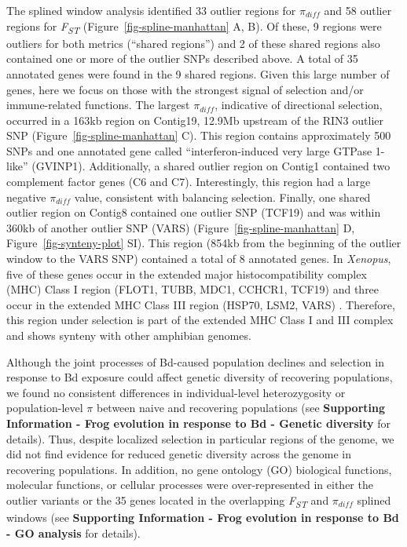 \documentclass[
  letterpaper,
  DIV=11,
  numbers=noendperiod]{scrartcl}
\begin{document}
The splined window analysis identified 33 outlier regions for
\(\pi_{diff}\) and 58 outlier regions for \emph{F\textsubscript{ST}}
(Figure~\ref{fig-spline-manhattan} A, B). Of these, 9 regions were
outliers for both metrics (``shared regions'') and 2 of these shared
regions also contained one or more of the outlier SNPs described above.
A total of 35 annotated genes were found in the 9 shared regions. Given
this large number of genes, here we focus on those with the strongest
signal of selection and/or immune-related functions. The largest
\(\pi_{diff}\), indicative of directional selection, occurred in a 163kb
region on Contig19, 12.9Mb upstream of the RIN3 outlier SNP
(Figure~\ref{fig-spline-manhattan} C). This region contains
approximately 500 SNPs and one annotated gene called
``interferon-induced very large GTPase 1-like'' (GVINP1). Additionally,
a shared outlier region on Contig1 contained two complement factor genes
(C6 and C7). Interestingly, this region had a large negative
\(\pi_{diff}\) value, consistent with balancing selection. Finally, one
shared outlier region on Contig8 contained one outlier SNP (TCF19) and
was within 360kb of another outlier SNP (VARS)
(Figure~\ref{fig-spline-manhattan} D, Figure~\ref{fig-synteny-plot} SI).
This region (854kb from the beginning of the outlier window to the VARS
SNP) contained a total of 8 annotated genes. In \emph{Xenopus}, five of
these genes occur in the extended major histocompatibility complex (MHC)
Class I region (FLOT1, TUBB, MDC1, CCHCR1, TCF19) and three occur in the
extended MHC Class III region (HSP70, LSM2, VARS) \citep{ohta2006}.
Therefore, this region under selection is part of the extended MHC Class
I and III complex and shows synteny with other amphibian genomes.

Although the joint processes of Bd-caused population declines and
selection in response to Bd exposure could affect genetic diversity of
recovering populations, we found no consistent differences in
individual-level heterozygosity or population-level \(\pi\) between
naive and recovering populations (see \textbf{Supporting Information -
Frog evolution in response to Bd - Genetic diversity} for details).
Thus, despite localized selection in particular regions of the genome,
we did not find evidence for reduced genetic diversity across the genome
in recovering populations. In addition, no gene ontology (GO) biological
functions, molecular functions, or cellular processes were
over-represented in either the outlier variants or the 35 genes located
in the overlapping \emph{F\textsubscript{ST}} and \(\pi_{diff}\) splined
windows (see \textbf{Supporting Information - Frog evolution in response
to Bd} \textbf{- GO analysis} for details).
\end{document}
